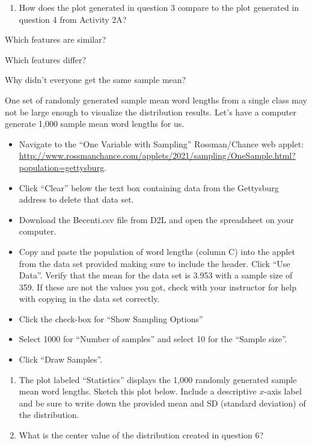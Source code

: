 \documentclass[
]{report}
\providecommand{\tightlist}{%
  \setlength{\itemsep}{0pt}\setlength{\parskip}{0pt}}
\newcommand{\rgi}{\hspace{24pt}}  %
\begin{document}
\newpage

\begin{enumerate}
\def\labelenumi{\arabic{enumi}.}
\setcounter{enumi}{4}
\tightlist
\item
  How does the plot generated in question 3 compare to the plot generated in question 4 from Activity 2A?
\end{enumerate}

\rgi Which features are similar?\\
\vspace{0.4in}

\rgi Which features differ?

\vspace{0.4in}

\rgi Why didn't everyone get the same sample mean?
\vspace{0.4in}

One set of randomly generated sample mean word lengths from a single class may not be large enough to visualize the distribution results. Let's have a computer generate 1,000 sample mean word lengths for us.

\begin{itemize}
\item
  Navigate to the ``One Variable with Sampling'' Rossman/Chance web applet: \url{http://www.rossmanchance.com/applets/2021/sampling/OneSample.html?population=gettysburg}.
\item
  Click ``Clear'' below the text box containing data from the Gettysburg address to delete that data set.
\item
  Download the Becenti.csv file from D2L and open the spreadsheet on your computer.
\item
  Copy and paste the population of word lengths (column C) into the applet from the data set provided making sure to include the header. Click ``Use Data''. Verify that the mean for the data set is 3.953 with a sample size of 359. If these are not the values you got, check with your instructor for help with copying in the data set correctly.
\item
  Click the check-box for ``Show Sampling Options''
\item
  Select 1000 for ``Number of samples'' and select 10 for the ``Sample size''.
\item
  Click ``Draw Samples''.
\end{itemize}

\begin{enumerate}
\def\labelenumi{\arabic{enumi}.}
\setcounter{enumi}{5}
\item
  The plot labeled ``Statistics'' displays the 1,000 randomly generated sample mean word lengths. Sketch this plot below. Include a descriptive \(x\)-axis label and be sure to write down the provided mean and SD (standard deviation) of the distribution.
  \vspace{1.5in}
\item
  What is the center value of the distribution created in question 6?
  \vspace{0.3in}
\end{enumerate}
\end{document}
